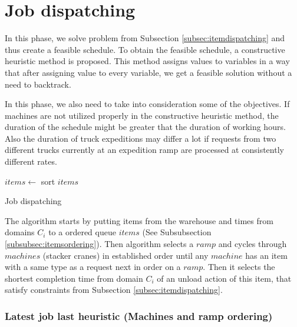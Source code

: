 \documentclass{ctuthesis}
\begin{document}
\section{Job dispatching}

In this phase, we solve problem from Subsection \ref{subsec:itemdispatching} and thus create a feasible schedule.
To obtain the feasible schedule, a constructive heuristic method is proposed. This method assigns values to variables in a way that after assigning value to every variable, we get a feasible solution without a need to backtrack.


In this phase, we also need to take into consideration some of the objectives. If machines are not utilized properly in the constructive heuristic method, the duration of the schedule might be greater that the duration of working hours. Also the duration of truck expeditions may differ a lot if requests from two different trucks currently at an expedition ramp are processed at consistently different rates.

\begin{algorithm}[H]
\SetAlgoLined
{}
  $items \leftarrow$ sort $items$\;
\caption{Job dispatching}
\end{algorithm}

The algorithm starts by putting items from the warehouse and times from domains $C_i$ to a ordered queue $items$ (See Subsubsection \ref{subsubsec:itemsordering}). Then algorithm selects a $ramp$ and cycles through $machines$ (stacker cranes) in established order until any $machine$ has an item with a same type as a request next in order on a $ramp$. Then it selects the shortest completion time from domain $C_i$ of an unload action of this item, that satisfy constraints from Subsection \ref{subsec:itemdispatching}. 


\subsubsection{Latest job last heuristic (Machines and ramp ordering)}
\end{document}
